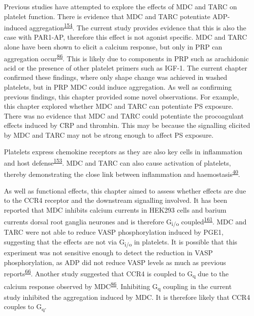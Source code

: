 \documentclass[11pt,twoside]{bristolthesis}
\begin{document}
Previous studies have attempted to explore the effects of MDC and TARC on platelet function. There is evidence that MDC and TARC potentiate ADP-induced aggregation\textsuperscript{\protect\hyperlink{ref-Gear2001}{154}}. The current study provides evidence that this is also the case with PAR1-AP, therefore this effect is not agonist specific. MDC and TARC alone have been shown to elicit a calcium response, but only in PRP can aggregation occur\textsuperscript{\protect\hyperlink{ref-Kowalska2000}{86}}. This is likely due to components in PRP such as arachidonic acid or the presence of other platelet primers such as IGF-1. The current chapter confirmed these findings, where only shape change was achieved in washed platelets, but in PRP MDC could induce aggregation. As well as confirming previous findings, this chapter provided some novel observations. For example, this chapter explored whether MDC and TARC can potentiate PS exposure. There was no evidence that MDC and TARC could potentiate the procoagulant effects induced by CRP and thrombin. This may be because the signalling elicited by MDC and TARC may not be strong enough to affect PS exposure.

Platelets express chemokine receptors as they are also key cells in inflammation and host defense\textsuperscript{\protect\hyperlink{ref-Clemetson2000}{153}}. MDC and TARC can also cause activation of platelets, thereby demonstrating the close link between inflammation and haemostasis\textsuperscript{\protect\hyperlink{ref-Gear2003}{40}}.

As well as functional effects, this chapter aimed to assess whether effects are due to the CCR4 receptor and the downstream signalling involved. It has been reported that MDC inhibits calcium currents in HEK293 cells and barium currents dorsal root ganglia neurones and is therefore G\textsubscript{i/o} coupled\textsuperscript{\protect\hyperlink{ref-Oh2002}{161}}. MDC and TARC were not able to reduce VASP phosphorylation induced by PGE1, suggesting that the effects are not via G\textsubscript{i/o} in platelets. It is possible that this experiment was not sensitive enough to detect the reduction in VASP phosphorylation, as ADP did not reduce VASP levels as much as previous reports\textsuperscript{\protect\hyperlink{ref-Hezard2005}{66}}. Another study suggested that CCR4 is coupled to G\textsubscript{q} due to the calcium response observed by MDC\textsuperscript{\protect\hyperlink{ref-Kowalska2000}{86}}. Inhibiting G\textsubscript{q} coupling in the current study inhibited the aggregation induced by MDC. It is therefore likely that CCR4 couples to G\textsubscript{q}.
\end{document}
